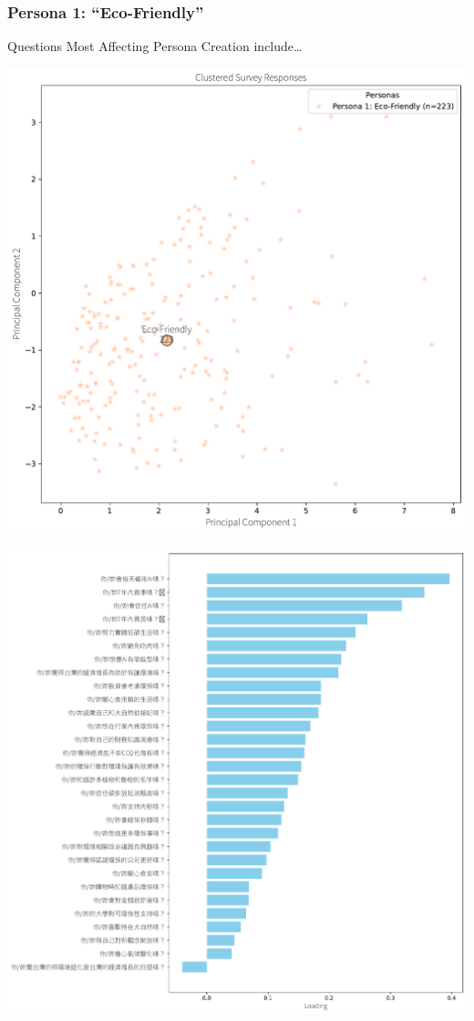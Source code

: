 \documentclass[
  letterpaper,
  DIV=11,
  numbers=noendperiod]{scrartcl}
\begin{document}
\subsubsection{Persona 1:
``Eco-Friendly''}\label{persona-1-eco-friendly}

Questions Most Affecting Persona Creation include\ldots{}

\includegraphics{_thesis_files/figure-pdf/cell-79-output-1.pdf}

\includegraphics{_thesis_files/figure-pdf/cell-79-output-2.pdf}
\end{document}
